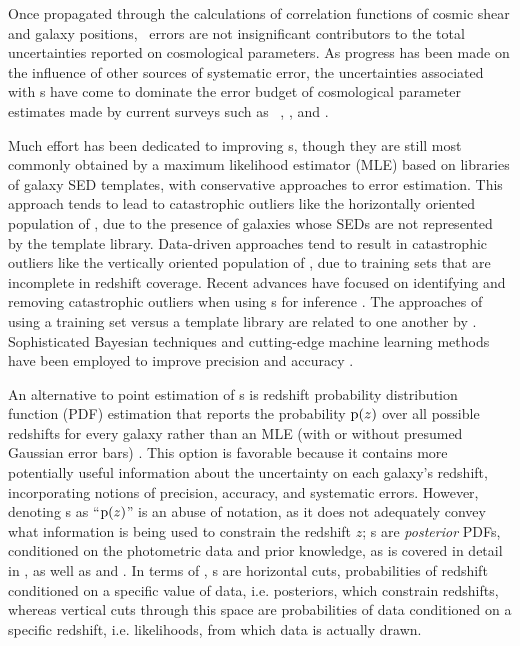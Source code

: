 Once propagated through the calculations of correlation functions of cosmic shear and galaxy positions, \pz\ errors are not insignificant contributors to the total uncertainties reported on cosmological parameters.
As progress has been made on the influence of other sources of systematic error, the uncertainties associated with \pz s have come to dominate the error budget of cosmological parameter estimates made by current surveys such as \des\ \citep{hoyle_dark_2017},  \citep{tanaka_photometric_2018}, and  \citep{hildebrandt_kids-450:_2017}.

Much effort has been dedicated to improving \pz s, though they are still most commonly obtained by a maximum likelihood estimator (MLE) based on libraries of galaxy SED templates, with conservative approaches to error estimation.
This approach tends to lead to catastrophic outliers like the horizontally oriented population of , due to the presence of galaxies whose SEDs are not represented by the template library.
Data-driven approaches tend to result in catastrophic outliers like the vertically oriented population of , due to training sets that are incomplete in redshift coverage.
Recent advances have focused on identifying and removing catastrophic outliers when using \pz s for 
inference \citep{Gorecki2014}.  
The approaches of using a training set versus a template library are related to one another by \citet{Budavari2009}.
Sophisticated Bayesian techniques and cutting-edge machine learning methods have been employed to improve precision \citep{Carliles2010} and accuracy \citep{Sadeh2015}. 

An alternative to point estimation of \pz s is redshift probability distribution function (PDF) estimation that reports the probability $\mathrm{p}(z)$ over all possible redshifts for every galaxy rather than an MLE (with or without presumed Gaussian error bars) \citep{Koo1999}.  
This option is favorable because it contains more potentially useful information about the uncertainty on each galaxy's redshift, incorporating notions of precision, accuracy, and systematic errors.
However, denoting \pzpdf s as ``$\mathrm{p}(z)$'' is an abuse of notation, as it does not adequately convey what information is being used to constrain the redshift $z$; \pzpdf s are \textit{posterior} PDFs, conditioned on the photometric data and prior knowledge, as is covered in detail in , as well as  and .
In terms of , \pzpdf s are horizontal cuts, probabilities of redshift conditioned on a specific value of data, i.e. posteriors, which constrain redshifts, whereas vertical cuts through this space are probabilities of data conditioned on a specific redshift, i.e. likelihoods, from which data is actually drawn.

